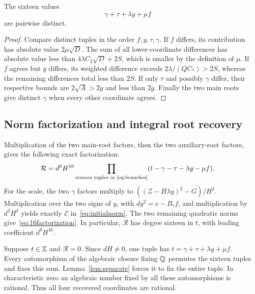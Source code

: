 \begin{lemma}
\label{lem:separate}
The sixteen values
\begin{equation}
\gamma+\tau+\lambda y+\mu f
\label{eq:compressed}
\end{equation}
are pairwise distinct.
\end{lemma}
\begin{proof}
Compare distinct tuples in the order $f,y,\tau,\gamma$.
If $f$ differs, its contribution has absolute value $2\mu\sqrt D$.
The sum of all lower-coordinate differences has absolute value less
than $4\lambda C_2\sqrt D+2S$, which is smaller by the definition of
$\mu$.  If $f$ agrees but $y$ differs, its weighted difference exceeds
$2\lambda/(QC_*)>2S$, whereas the remaining differences total less
than $2S$.  If only $\tau$ and possibly $\gamma$ differ, their respective
bounds are $2\sqrt A>2g$ and less than $2g$.  Finally the two main
roots give distinct $\gamma$ when every other coordinate agrees.
\end{proof}

\subsection{Norm factorization and integral root recovery}

Multiplication of the two main-root factors, then the two auxiliary-root
factors, gives the following exact factorization:
\begin{equation}
\mathcal R=d^8H^{16}
 \prod_{\text{sixteen tuples in \eqref{eq:branches}}}
 (t-\gamma-\tau-\lambda y-\mu f).
\label{eq:16factorization}
\end{equation}
For the scale, the two $\gamma$ factors multiply to
$((\mathcal Z-H\lambda y)^2-G)/H^2$.
Multiplication over the two signs of $y$, with $dy^2=e-B_*f$,
and multiplication by $d^2H^4$ yields exactly
$\mathcal E$ in~\eqref{eq:initialnorm}.  The two remaining quadratic
norms give~\eqref{eq:16factorization}.  In particular, $\mathcal R$
has degree sixteen in $t$, with leading coefficient $d^8H^{16}$.

Suppose $t\in\mathbb Z$ and $\mathcal R=0$.  Since $dH\ne0$, one tuple has
$t=\gamma+\tau+\lambda y+\mu f$.  Every automorphism of the algebraic
closure fixing $\mathbb Q$ permutes the sixteen tuples and fixes this sum.
Lemma~\ref{lem:separate} forces it to fix the entire tuple.  In
characteristic zero an algebraic number fixed by all these automorphisms
is rational.  Thus all four recovered coordinates are rational.

